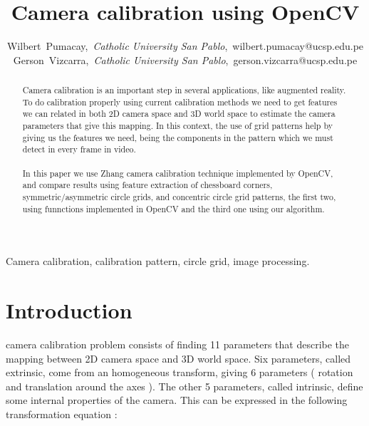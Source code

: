 \documentclass[journal]{IEEEtran}
\begin{document}
\title{Camera calibration using OpenCV}

\author{Wilbert~Pumacay,~\textit{Catholic University San Pablo},~wilbert.pumacay@ucsp.edu.pe\\
        Gerson~Vizcarra,~\textit{Catholic University San Pablo},~gerson.vizcarra@ucsp.edu.pe}

\maketitle

\begin{abstract}
Camera calibration is an important step in several applications, like augmented reality. To do calibration properly using current calibration methods we need to get features we can related in both 2D camera space and 3D world space to estimate the camera parameters that give this mapping. In this context, the use of grid patterns help by giving us the features we need, being the components in the pattern which we must detect in every frame in video.
\\
\\
In this paper we use Zhang \cite{CameraCalibration1} camera calibration technique implemented by OpenCV, and compare results using feature extraction of chessboard corners, symmetric/asymmetric circle grids, and concentric circle grid patterns, the first two, using funnctions implemented in OpenCV and the third one using our algorithm.
\end{abstract}

\begin{IEEEkeywords}
Camera calibration, calibration pattern, circle grid, image processing.
\end{IEEEkeywords}


\section{Introduction}

 camera calibration problem consists of finding 11 parameters that describe the mapping between 2D camera space and 3D world space. Six parameters, called extrinsic, come from an homogeneous transform, giving 6 parameters ( rotation and translation around the axes ). The other 5 parameters, called intrinsic, define some internal properties of the camera. This can be expressed in the following transformation equation :
\end{document}
